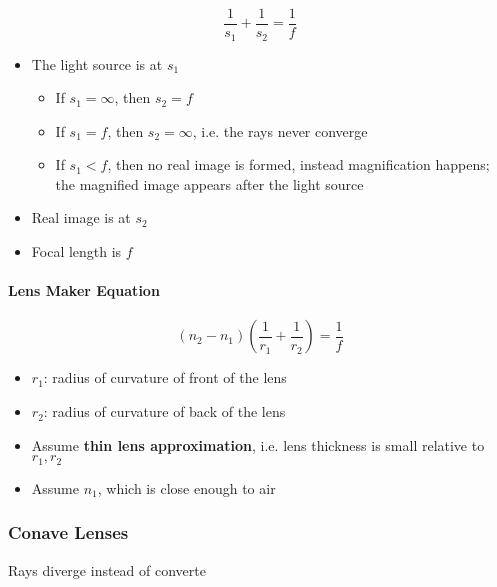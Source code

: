     \begin{equation}
      \frac{1}{s_{1}} + \frac{1}{s_{2}} = \frac{1}{f}
    \end{equation}

    \begin{itemize}
      \item The light source is at $ s_{1} $
      \begin{itemize}
        \item If $ s_{1} = \infty $, then $ s_{2} = f $
        \item If $ s_{1} = f $, then $ s_{2} = \infty $, i.e. the rays never
        converge
        \item If $ s_{1} < f $, then no real image is formed, instead
        magnification happens; the magnified image appears after the light
        source
      \end{itemize}

      \item Real image is at $ s_{2} $
      \item Focal length is $ f $
    \end{itemize}

    \paragraph{Lens Maker Equation}
    \begin{equation}
      \left( n_{2} - n_{1} \right)
      \left( \frac{1}{r_{1}} + \frac{1}{r_{2}} \right)
      = \frac{1}{f}
    \end{equation}

    \begin{itemize}
      \item $ r_{1} $: radius of curvature of front of the lens
      \item $ r_{2} $: radius of curvature of back of the lens
      \item Assume \textbf{thin lens approximation}, i.e. lens thickness is
      small relative to $ r_{1}, r_{2} $
      \item Assume $ n_{1} $, which is close enough to air
    \end{itemize}

  \subsubsection{Conave Lenses}

    Rays diverge instead of converte

